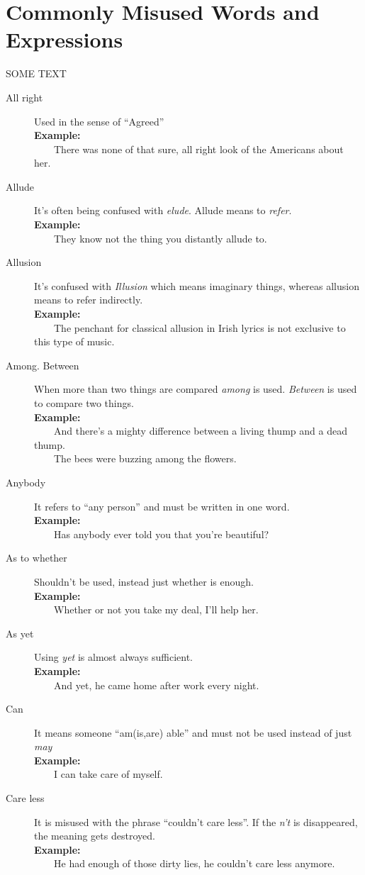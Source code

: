 \documentclass{report}
\newcommand{\xmpl}{\textbf{Example:}\\} %
\newcommand{\indnt}{\ \ \ \ } %
\begin{document}
\chapter{Commonly Misused Words and Expressions}
SOME TEXT
\begin{description}
	\item[All right] Used in the sense of ``Agreed''\\
	\xmpl
	\indnt There was none of that sure, all right look of the Americans about her.
	\item[Allude] It's often being confused with \textit{elude}. Allude means to \textit{refer}.\\
	\xmpl
	\indnt They know not the thing you distantly allude to.
	\item[Allusion] It's confused with \textit{Illusion} which means imaginary things, whereas allusion means to refer indirectly.\\
	\xmpl
	\indnt The penchant for classical allusion in Irish lyrics is not exclusive to this type of music. 
	\item[Among. Between] When more than two things are compared \textit{among} is used. \emph{Between} is used to compare two things.\\
	\xmpl
	\indnt And there's a mighty difference between a living thump and a dead thump.\\
	\indnt The bees were buzzing among the flowers.
	\item[Anybody] It refers to ``any person'' and must be written in one word.\\
	\xmpl
	\indnt Has anybody ever told you that you're beautiful?
	\item[As to whether] Shouldn't be used, instead just whether is enough.\\
	\xmpl
	\indnt Whether or not you take my deal, I'll help her.
	\item[As yet] Using \textit{yet} is almost always sufficient.\\
	\xmpl
	\indnt And yet, he came home after work every night.
	\item[Can] It means someone ``am(is,are) able'' and must not be used instead of just \textit{may}\\
	\xmpl
	\indnt I can take care of myself.
	\item[Care less] It is misused with the phrase ``couldn't care less''. If the \textit{n't} is disappeared, the meaning gets destroyed.\\
	\xmpl
	\indnt He had enough of those dirty lies, he couldn't care less anymore.

\end{description}
\end{document}
